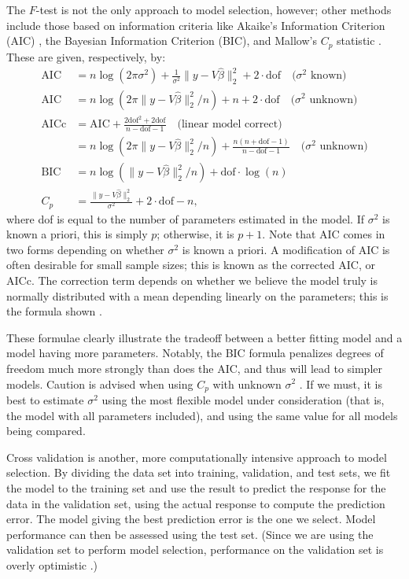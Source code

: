 \documentclass[12pt]{article}
\begin{document}
The $F$-test is not the only approach to model selection, however; other methods include those based on information criteria like Akaike's Information Criterion (AIC) \cite[\S~12.3.3]{Seber:2003}, the Bayesian Information Criterion (BIC), and Mallow's $C_p$ statistic \cite[\S~10.2.1]{Weisberg:2005}. These are given, respectively, by:
\begin{align*}
   \textrm{AIC} &= n \log (2 \pi \sigma^2) + \frac{1}{\sigma^2} \| y - V \hat{\beta} \|_2^2 + 2 \cdot \textrm{dof} \quad \textrm{($\sigma^2$ known)}\\
    \textrm{AIC} &= n \log (2 \pi \| y - V \hat{\beta} \|_2^2 / n) + n + 2 \cdot \textrm{dof} \quad \textrm{($\sigma^2$ unknown)} \\
     \textrm{AICc} &= \textrm{AIC} + \frac{2\textrm{dof}^2 + 2 \textrm{dof}}{n - \textrm{dof} - 1} \quad \textrm{(linear model correct)} \\
      &= n \log (2 \pi \| y - V \hat{\beta} \|_2^2 / n) + \frac{n(n + \textrm{dof} - 1) }{n - \textrm{dof} - 1} \quad \textrm{($\sigma^2$ unknown)} \\
   \textrm{BIC} &= n \log(\| y - V \hat{\beta} \|_2^2 / n) + \textrm{dof} \cdot \log(n) \\
   C_p &= \frac{\| y - V \hat{\beta} \|_2^2}{\sigma^2}  + 2 \cdot \textrm{dof} - n,
\end{align*}
where dof is equal to the number of parameters estimated in the model. If $\sigma^2$ is known a priori, this is simply $p$; otherwise, it is $p+1$. Note that AIC comes in two forms depending on whether $\sigma^2$ is known a priori. A modification of AIC is often desirable for small sample sizes; this is known as the corrected AIC, or AICc. The correction term depends on whether we believe the model truly is normally distributed with a mean depending linearly on the parameters; this is the formula shown \cite[\S~7.7.6]{Burnham:2002}.

These formulae clearly illustrate the tradeoff between a better fitting model and a model having more parameters. Notably, the BIC formula penalizes degrees of freedom much more strongly than does the AIC, and thus will lead to simpler models. Caution is advised when using $C_p$ with unknown $\sigma^2$ \cite[\S~1.8.6]{Wood:2017}. If we must, it is best to estimate $\sigma^2$ using the most flexible model under consideration (that is, the model with all parameters included), and using the same value for all models being compared.

Cross validation is another, more computationally intensive approach to model selection. By dividing the data set into training, validation, and test sets, we fit the model to the training set and use the result to predict the response for the data in the validation set, using the actual response to compute the prediction error. The model giving the best prediction error is the one we select. Model performance can then be assessed using the test set. (Since we are using the validation set to perform model selection, performance on the validation set is overly optimistic \cite[\S~7.10]{Hastie:2001}.)
\end{document}
